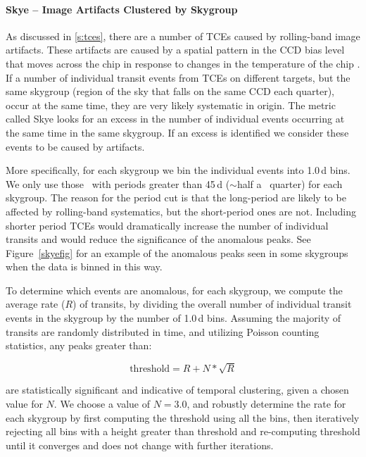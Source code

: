 \paragraph{Skye -- Image Artifacts Clustered by Skygroup}
\label{s:skye}

As discussed in \ref{s:tces}, there are a number of TCEs caused by rolling-band image artifacts. These artifacts are caused by a spatial pattern in the CCD bias level that moves across the chip in response to changes in the temperature of the chip \citep[for more detail see ][]{VanCleve2009}. If a number of individual transit events from TCEs on different targets, but the same skygroup (region of the sky that falls on the same CCD each quarter), occur at the same time, they are very likely systematic in origin. The metric called Skye looks for an excess in the number of individual events occurring at the same time in the same skygroup. If an excess is identified we consider these events to be caused by artifacts. 

More specifically, for each skygroup we bin the individual events into 1.0\,d bins. We only use those \opstce\ with periods greater than 45\,d ($\sim$half a \Kepler\ quarter) for each skygroup. The reason for the period cut is that the long-period  are likely to be affected by rolling-band systematics, but the short-period ones are not.  Including shorter period TCEs would dramatically increase the number of individual transits and would reduce the significance of the anomalous peaks.  See Figure~\ref{skyefig} for an example of the anomalous peaks seen in some skygroups when the data is binned in this way.

To determine which events are anomalous, for each skygroup, we compute the average rate ($R$) of transits, by dividing the overall number of individual transit events in the skygroup by the number of 1.0\,d bins. Assuming the majority of transits are randomly distributed in time, and utilizing Poisson counting statistics, any peaks greater than:

\begin{equation}
\label{eq:skye}
\mathrm{threshold} = R + N*\sqrt{R}
\end{equation}

\noindent are statistically significant and indicative of temporal clustering, given a chosen value for $N$. We choose a value of $N = 3.0$, and robustly determine the rate for each skygroup by first computing the threshold using all the bins, then iteratively rejecting all bins with a height greater than threshold and re-computing threshold until it converges and does not change with further iterations.

